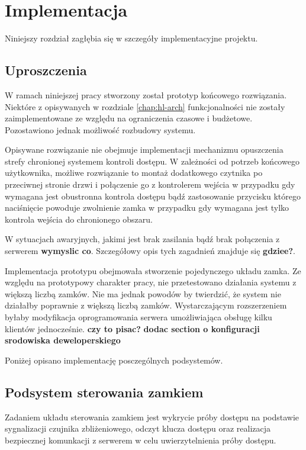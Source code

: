 \chapter{Implementacja}
\label{chap:implementation}

    Niniejszy rozdział zagłębia się w szczegóły implementacyjne projektu.

    \section{Uproszczenia}

        W ramach niniejszej pracy stworzony został prototyp końcowego rozwiązania. Niektóre z opisywanych w rozdziale \ref{chap:hl-arch} funkcjonalności nie zostały zaimplementowane ze względu na ograniczenia czasowe i budżetowe. Pozostawiono jednak możliwość rozbudowy systemu.

        Opisywane rozwiązanie nie obejmuje implementacji mechanizmu opuszczenia strefy chronionej systemem kontroli dostępu. W zależności od potrzeb końcowego użytkownika, możliwe rozwiązanie to montaż dodatkowego czytnika po przeciwnej stronie drzwi i połączenie go z kontrolerem wejścia w przypadku gdy wymagana jest obustronna kontrola dostępu bądź zastosowanie przycisku którego naciśnięcie powoduje zwolnienie zamka w przypadku gdy wymagana jest tylko kontrola wejścia do chronionego obszaru.

        W sytuacjach awaryjnych, jakimi jest brak zasilania bądź brak połączenia z serwerem \textbf{wymyslic co}. Szczegółowy opis tych zagadnień znajduje się \textbf{gdziee?}.

        Implementacja prototypu obejmowała stworzenie pojedynczego układu zamka. Ze względu na prototypowy charakter pracy, nie przetestowano działania systemu z większą liczbą zamków. Nie ma jednak powodów by twierdzić, że system nie działałby poprawnie z większą liczbą zamków. Wystarczającym rozszerzeniem byłaby modyfikacja oprogramowania serwera umożliwiająca obsługę kilku klientów jednocześnie. \textbf{czy to pisac?}
    \textbf{dodac section o  konfiguracji srodowiska deweloperskiego}

    Poniżej opisano implementację posczególnych podsystemów.

    \section{Podsystem sterowania zamkiem}

        Zadaniem układu sterowania zamkiem jest wykrycie próby dostępu na podstawie sygnalizacji czujnika zbliżeniowego, odczyt klucza dostępu oraz realizacja bezpiecznej komunkacji z serwerem w celu uwierzytelnienia próby dostępu.


